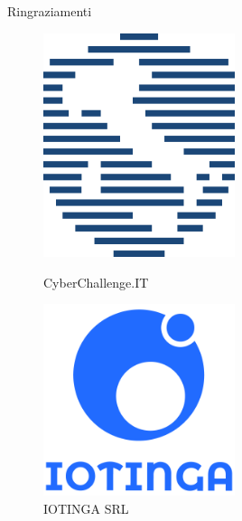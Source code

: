 \documentclass[12pt]{beamer}
\begin{document}
\begin{frame}{Ringraziamenti}
    \begin{figure}[ht]
        \begin{minipage}[b]{0.45\linewidth}
            \centering
            \includegraphics[width=0.5\textwidth]{img/ccit.png}
            \caption*{CyberChallenge.IT}
            \label{fig:a}
        \end{minipage}
        \hspace{0.5cm}
        \begin{minipage}[b]{0.45\linewidth}
            \centering
            \includegraphics[width=0.5\textwidth]{img/iotinga.png}
            \caption*{IOTINGA SRL}
            \label{fig:b}
        \end{minipage}
    \end{figure}
\end{frame}
\end{document}
